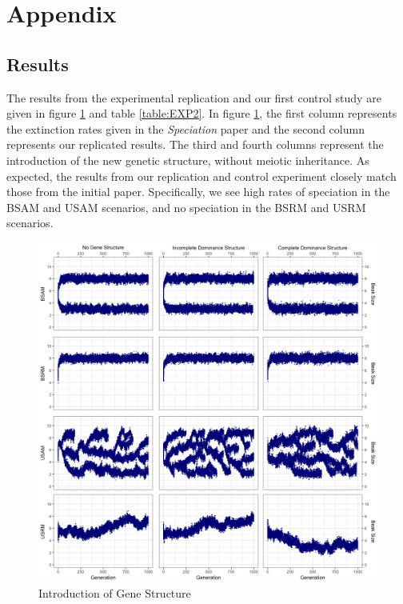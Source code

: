 \documentclass{article}
\begin{document}
\newpage

\section{Appendix}

\subsection{Results}

The results from the experimental replication and our first control study are given in figure \ref{fig:EXP2} and table \ref{table:EXP2}. In figure \ref{fig:EXP2}, the first column represents the extinction rates given in the \textit{Speciation} paper and the second column represents our replicated results. The third and fourth columns represent the introduction of the new genetic structure, without meiotic inheritance. As expected, the results from our replication and control experiment closely match those from the initial paper. Specifically, we see high rates of speciation in the BSAM and USAM scenarios, and no speciation in the BSRM and USRM scenarios.

\begin{figure}
    \centering
    \includegraphics[width=\linewidth]{Data/EXP2}
    \caption{Introduction of Gene Structure}
    \label{fig:EXP2}
\end{figure}
\end{document}
